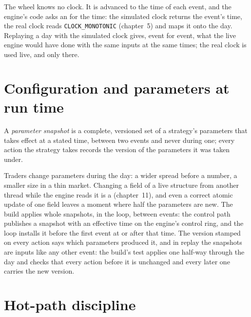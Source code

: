 \label{lst:ll:the-strategy-engine:wheel}

The wheel knows no clock. It is advanced to the time of each event, and the engine's code asks an  for the time:
the simulated clock returns the event's time, the real clock reads \texttt{CLOCK\_MONOTONIC} (chapter~5) and maps it onto the
day. Replaying a day with the simulated clock gives, event for event, what the live engine would have done with the same inputs
at the same times; the real clock is used live, and only there.

\label{lst:ll:the-strategy-engine:clock}

\section{Configuration and parameters at run time}

\begin{definition}\label{def:ll:the-strategy-engine:snapshot}
A \emph{parameter snapshot} is a complete, versioned set of a strategy's parameters that takes effect at a stated time, between
two events and never during one; every action the strategy takes records the version of the parameters it was taken under.
\end{definition}

Traders change parameters during the day: a wider spread before a number, a smaller size in a thin market. Changing a field of
a live structure from another thread while the engine reads it is a  (chapter~11), and even a correct atomic update of
one field leaves a moment where half the parameters are new. The build applies whole snapshots, in the loop, between events:
the control path publishes a snapshot with an effective time on the engine's control ring, and the loop installs it before the
first event at or after that time. The version stamped on every action says which parameters produced it, and in replay the
snapshots are inputs like any other event: the build's test applies one half-way through the day and checks that every action
before it is unchanged and every later one carries the new version.

\section{Hot-path discipline}

